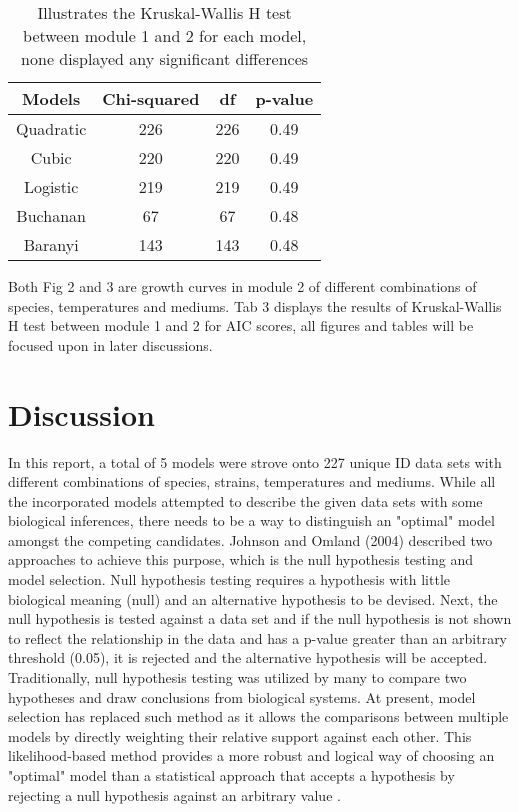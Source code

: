 \documentclass[11pt, a4paper]{article} %
\begin{document}
\begin{table}[!hb]
    \centering
     \begin{tabular}{||c c c c||} 
     \hline
     Models & Chi-squared & df & p-value\\ [0.5ex] 
     \hline\hline
     Quadratic & 226 & 226 & 0.49\\ 
     \hline
     Cubic & 220 & 220 & 0.49\\
     \hline
     Logistic & 219 & 219 & 0.49\\
     \hline
     Buchanan & 67 & 67 & 0.48\\
     \hline
     Baranyi & 143 & 143 & 0.48\\ [1ex] 
     \hline
    \end{tabular}
    \caption{Illustrates the Kruskal-Wallis H test between module 1 and 2 for each model, none displayed any significant differences}
    \label{tab:my_label}
\end{table}

\noindent Both Fig 2 and 3 are growth curves in module 2 of different combinations of species, temperatures and mediums. Tab 3 displays the results of Kruskal-Wallis H test between module 1 and 2 for AIC scores, all figures and tables will be focused upon in later discussions.

\newpage

\section{Discussion}
In this report, a total of 5 models were strove onto 227 unique ID data sets with different combinations of species, strains, temperatures and mediums. While all the incorporated models attempted to describe the given data sets with some biological inferences, there needs to be a way to distinguish an "optimal" model amongst the competing candidates. Johnson and Omland (2004) described two approaches to achieve this purpose, which is the null hypothesis testing and model selection. Null hypothesis testing requires a hypothesis with little biological meaning (null) and an alternative hypothesis to be devised. Next, the null hypothesis is tested against a data set and if the null hypothesis is not shown to reflect the relationship in the data and has a p-value greater than an arbitrary threshold (0.05), it is rejected and the alternative hypothesis will be accepted. Traditionally, null hypothesis testing was utilized by many to compare two hypotheses and draw conclusions from biological systems. At present, model selection has replaced such method as it allows the comparisons between multiple models by directly weighting their relative support against each other. This likelihood-based method provides a more robust and logical way of choosing an "optimal" model than a statistical approach that accepts a hypothesis by rejecting a null hypothesis against an arbitrary value \cite{johnson2004model}.\\
\end{document}
